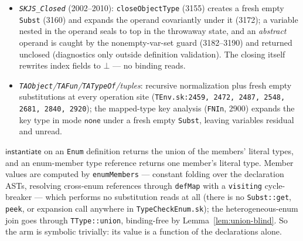 \documentclass[11pt]{article}
\newcommand{\instop}{\mathsf{instantiate}}
\newcommand{\NoneM}{\mathsf{none}}
\begin{document}
\begin{lemma}
\begin{itemize}
  Definition~\ref{def:symbolic} holds with the approximation being the
  reduced literal union, a function of the hole \emph{types} only.
\item \emph{\texttt{SKJS\_Closed}} (2002--2010): \texttt{closeObjectType}
  (3155) creates a fresh empty \texttt{Subst} (3160) and expands the
  operand covariantly under it (3172); a variable nested in the operand
  seals to top in the throwaway state, and an \emph{abstract} operand is
  caught by the nonempty-var-set guard (3182--3190) and returned
  unclosed (diagnostics only outside definition validation). The
  closing itself rewrites index fields to $\bot$ — no binding reads.
\item \emph{\texttt{TAObject}/\texttt{TAFun}/\texttt{TATypeOf}/tuples}:
  recursive normalization plus fresh empty substitutions at every
  operation site (\texttt{TEnv.sk:2459, 2472, 2487, 2548, 2681, 2840,
  2920}); the mapped-type key analysis (\texttt{FNIn}, 2900)
  expands the key type in mode $\NoneM$ under a fresh empty
  \texttt{Subst}, leaving variables residual and unread.
\end{itemize}
\end{lemma}

\begin{lemma}
\label{lem:enum-blind}
$\instop$ on an \texttt{Enum} definition returns the union of the
members' literal types, and an enum-member type reference returns one
member's literal type. Member values are computed by
\texttt{enumMembers} — constant folding over the declaration ASTs,
resolving cross-enum references through \texttt{defMap} with a
\texttt{visiting} cycle-breaker — which performs no substitution reads
at all (there is no \texttt{Subst::get}, \texttt{peek}, or expansion
call anywhere in \texttt{TypeCheckEnum.sk}); the heterogeneous-enum
join goes through \texttt{TType::union}, binding-free by
Lemma~\ref{lem:union-blind}. So the arm is symbolic trivially: its
value is a function of the declarations alone.
\end{lemma}
\end{document}
